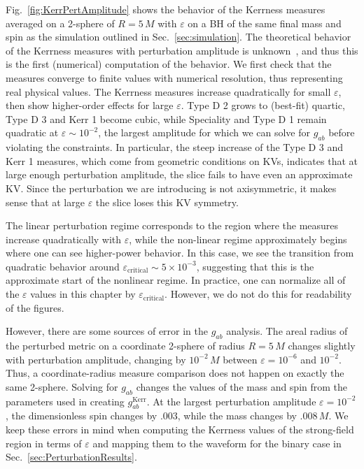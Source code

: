 
Fig.~\ref{fig:KerrPertAmplitude} shows the behavior of the Kerrness measures averaged on a 2-sphere of $R=5\,M$ with $\varepsilon$ on a BH of the same final mass and spin as the simulation outlined in Sec.~\ref{sec:simulation}. The theoretical behavior of the Kerrness measures with perturbation amplitude is unknown~\cite{loboprivate, Ionescu:2014cta}, and thus this is the first (numerical) computation of the behavior. We first check that the measures converge to finite values with numerical resolution, thus representing real physical values. The Kerrness measures increase quadratically for small $\varepsilon$, then show higher-order effects for large $\varepsilon$. Type D 2 grows to (best-fit) quartic, Type D 3 and Kerr 1 become cubic, while Speciality and Type D 1 remain quadratic at $\varepsilon \sim 10^{-2}$, the largest amplitude for which we can solve for $g_{ab}$ before violating the constraints. In particular, the steep increase of the Type D 3 and Kerr 1 measures, which come from geometric conditions on KVs, indicates that at large enough perturbation amplitude, the slice fails to have even an approximate KV. Since the perturbation we are introducing is not axisymmetric, it makes sense that at large $\varepsilon$ the slice loses this KV symmetry. 

The linear perturbation regime corresponds to the region where the measures increase quadratically with $\varepsilon$, while the non-linear regime approximately begins where one can see higher-power behavior. In this case, we see the transition from quadratic behavior around $\varepsilon_\mathrm{critical} \sim 5 \times 10^{-3}$, suggesting that this is the approximate start of the nonlinear regime. In practice, one can normalize all of the $\varepsilon$ values in this chapter by $\varepsilon_\mathrm{critical}$. However, we do not do this for readability of the figures. 

However, there are some sources of error in the $g_{ab}$ analysis. The areal radius of the perturbed metric on a coordinate 2-sphere of radius $R = 5\,M$ changes slightly with perturbation amplitude, changing by $10^{-2}\,M$ between $\varepsilon = 10^{-6}$ and $10^{-2}$. Thus, a coordinate-radius measure comparison does not happen on exactly the same 2-sphere. Solving for $g_{ab}$ changes the values of the mass and spin from the parameters used in creating $g_{ab}^\mathrm{Kerr}$. At the largest perturbation amplitude $\varepsilon = 10^{-2}$, the dimensionless spin changes by $.003$, while the mass changes by $.008\,M$. We keep these errors in mind when computing the Kerrness values of the strong-field region in terms of $\varepsilon$ and mapping them to the waveform for the binary case in Sec.~\ref{sec:PerturbationResults}. 

